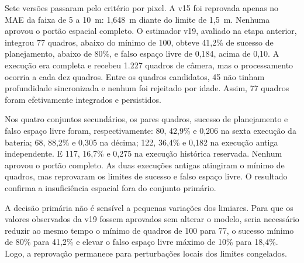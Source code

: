 \begin{table}[htb]
\centering
\caption{Profundidade e resultado espacial das versões monoculares.}
\label{tab:mono-versoes}
\end{table}

Sete versões passaram pelo critério por pixel. A v15 foi reprovada apenas no MAE da faixa de 5 a 10~m: 1,648~m diante do limite de 1,5~m. Nenhuma aprovou o portão espacial completo. O estimador v19, avaliado na etapa anterior, integrou 77 quadros, abaixo do mínimo de 100, obteve 41,2\% de sucesso de planejamento, abaixo de 80\%, e falso espaço livre de 0,184, acima de 0,10. A execução era completa e recebeu 1.227 quadros de câmera, mas o processamento ocorria a cada dez quadros. Entre os quadros candidatos, 45 não tinham profundidade sincronizada e nenhum foi rejeitado por idade. Assim, 77 quadros foram efetivamente integrados e persistidos.

Nos quatro conjuntos secundários, os pares quadros, sucesso de planejamento e falso espaço livre foram, respectivamente: 80, 42,9\% e 0,206 na sexta execução da bateria; 68, 88,2\% e 0,305 na décima; 122, 36,4\% e 0,182 na execução antiga independente. E 117, 16,7\% e 0,275 na execução histórica reservada. Nenhum aprovou o portão completo. As duas execuções antigas atingiram o mínimo de quadros, mas reprovaram os limites de sucesso e falso espaço livre. O resultado confirma a insuficiência espacial fora do conjunto primário.

A decisão primária não é sensível a pequenas variações dos limiares. Para que os valores observados da v19 fossem aprovados sem alterar o modelo, seria necessário reduzir ao mesmo tempo o mínimo de quadros de 100 para 77, o sucesso mínimo de 80\% para 41,2\% e elevar o falso espaço livre máximo de 10\% para 18,4\%. Logo, a reprovação permanece para perturbações locais dos limites congelados.

